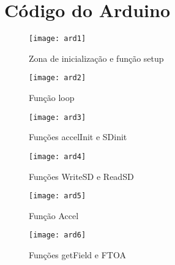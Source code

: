 \chapter{Código do Arduino}
\label{cha:codigo_do_arduino}

\begin{figure}[hbtp]
	\centering
	\texttt{[image: ard1]}
	\caption{Zona de inicialização e função setup}
	\label{fig:ard1}
\end{figure}

\begin{figure}[hbtp]
	\centering
	\texttt{[image: ard2]}
	\caption{Função loop}
	\label{fig:ard2}
\end{figure}

\begin{figure}[hbtp]
	\centering
	\texttt{[image: ard3]}
	\caption{Funções accelInit e SD\textunderscore init}
	\label{fig:ard3}
\end{figure}

\begin{figure}[hbtp]
	\centering
	\texttt{[image: ard4]}
	\caption{Funções WriteSD e ReadSD}
	\label{fig:ard4}
\end{figure}

\begin{figure}[hbtp]
	\centering
	\texttt{[image: ard5]}
	\caption{Função Accel}
	\label{fig:ard5}
\end{figure}

\begin{figure}[hbtp]
	\centering
	\texttt{[image: ard6]}
	\caption{Funções getField e FTOA}
	\label{fig:ard6}
\end{figure}